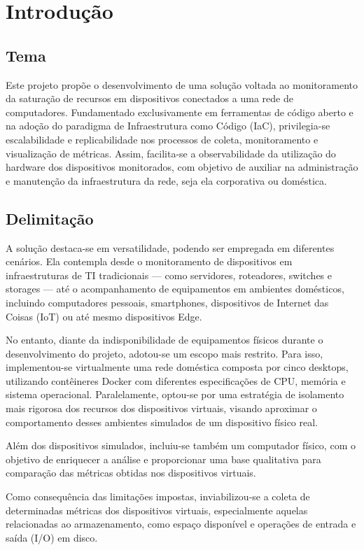 \chapter{Introdução}

\section{Tema}

Este projeto propõe o desenvolvimento de uma solução voltada ao monitoramento da saturação de recursos em dispositivos conectados a uma rede de computadores. Fundamentado exclusivamente em ferramentas de código aberto e na adoção do paradigma de Infraestrutura como Código (IaC), privilegia-se escalabilidade e replicabilidade nos processos de coleta, monitoramento e visualização de métricas. Assim, facilita-se a observabilidade da utilização do hardware dos dispositivos monitorados, com objetivo de auxiliar na administração e manutenção da infraestrutura da rede, seja ela corporativa ou doméstica.

\section{Delimitação}

A solução destaca-se em versatilidade, podendo ser empregada em diferentes cenários. Ela contempla desde o monitoramento de dispositivos em infraestruturas de TI tradicionais — como servidores, roteadores, switches e storages — até o acompanhamento de equipamentos em ambientes domésticos, incluindo computadores pessoais, smartphones, dispositivos de Internet das Coisas (IoT) ou até mesmo dispositivos Edge.

No entanto, diante da indisponibilidade de equipamentos físicos durante o desenvolvimento do projeto, adotou-se um escopo mais restrito. Para isso, implementou-se virtualmente uma rede doméstica composta por cinco desktops, utilizando contêineres Docker com diferentes especificações de CPU, memória e sistema operacional. Paralelamente, optou-se por uma estratégia de isolamento mais rigorosa dos recursos dos dispositivos virtuais, visando aproximar o comportamento desses ambientes simulados de um dispositivo físico real.

Além dos dispositivos simulados, incluiu-se também um computador físico, com o objetivo de enriquecer a análise e proporcionar uma base qualitativa para comparação das métricas obtidas nos dispositivos virtuais.

Como consequência das limitações impostas, inviabilizou-se a coleta de determinadas métricas dos dispositivos virtuais, especialmente aquelas relacionadas ao armazenamento, como espaço disponível e operações de entrada e saída (I/O) em disco.

